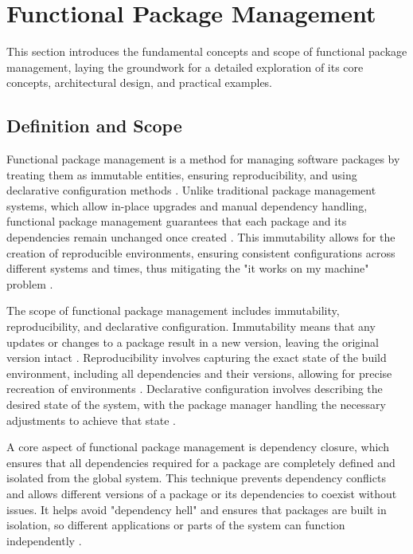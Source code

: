 \section{Functional Package Management}

This section introduces the fundamental concepts and scope of functional package
management, laying the groundwork for a detailed exploration of its core concepts,
architectural design, and practical examples.

\subsection{Definition and Scope}

Functional package management is a method for managing software packages by treating
them as immutable entities, ensuring reproducibility, and using declarative configuration
methods \cite[Section 2.1]{courtesFunctionalPackageManagement2013}. Unlike traditional
package management systems, which allow in-place upgrades and manual dependency handling,
functional package management guarantees that each package and its dependencies remain
unchanged once created \cite[Section 2.2]{courtesFunctionalPackageManagement2013}.
This immutability allows for the creation of reproducible environments, ensuring
consistent configurations across different systems and times, thus mitigating the
"it works on my machine" problem \cite[Section 2, Page 5]{rahmanWorksMeCannot2022}.

The scope of functional package management includes immutability, reproducibility,
and declarative configuration. Immutability means that any updates or changes to a
package result in a new version, leaving the original version intact
\cite[Page 84]{dolstraNixSafePolicyFree2004}. Reproducibility involves capturing
the exact state of the build environment, including all dependencies and their
versions, allowing for precise recreation of environments
\cite[Section 2.1]{courtesFunctionalPackageManagement2013}. Declarative configuration
involves describing the desired state of the system, with the package manager handling
the necessary adjustments to achieve that state \cite[Section 2.1]{courtesFunctionalPackageManagement2013}.

A core aspect of functional package management is dependency closure, which
ensures that all dependencies required for a package are completely defined and
isolated from the global system. This technique prevents dependency conflicts and
allows different versions of a package or its dependencies to coexist without
issues. It helps avoid "dependency hell" and ensures that packages are built in
isolation, so different applications or parts of the system can function independently
\cite[Chapter 3.3]{dolstraPurelyFunctionalSoftware2006}.

